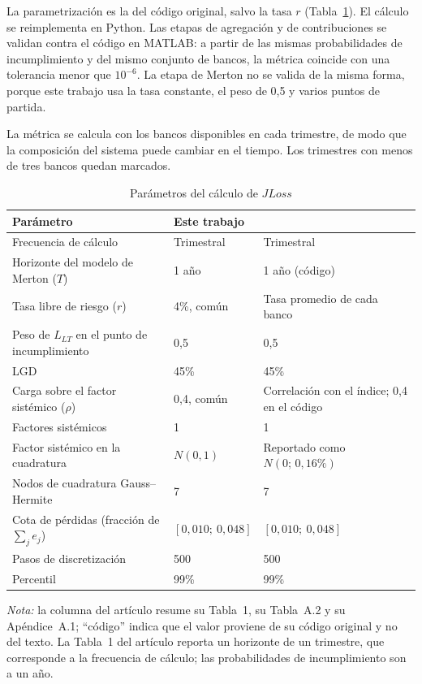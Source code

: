 La parametrización es la del código original, salvo la tasa $r$ (Tabla~\ref{tab:params}). El cálculo se reimplementa en Python. Las etapas de agregación y de contribuciones se validan contra el código en MATLAB: a partir de las mismas probabilidades de incumplimiento y del mismo conjunto de bancos, la métrica coincide con una tolerancia menor que $10^{-6}$. La etapa de Merton no se valida de la misma forma, porque este trabajo usa la tasa constante, el peso de 0,5 y varios puntos de partida.

La métrica se calcula con los bancos disponibles en cada trimestre, de modo que la composición del sistema puede cambiar en el tiempo. Los trimestres con menos de tres bancos quedan marcados.

\begin{table}[htbp]
\centering
\small
\caption{Parámetros del cálculo de $JLoss$}
\label{tab:params}
\begin{tabular}{lll}
\toprule
Parámetro & Este trabajo & \citet{Chari2024b} \\
\midrule
Frecuencia de cálculo & Trimestral & Trimestral \\
Horizonte del modelo de Merton ($T$) & 1 año & 1 año (código) \\
Tasa libre de riesgo ($r$) & 4\%, común & Tasa promedio de cada banco \\
Peso de $L_{LT}$ en el punto de incumplimiento & 0,5 & 0,5 \\
LGD & 45\% & 45\% \\
Carga sobre el factor sistémico ($\rho$) & 0,4, común & Correlación con el índice; 0,4 en el código \\
Factores sistémicos & 1 & 1 \\
Factor sistémico en la cuadratura & $N(0,1)$ & Reportado como $N(0;\,0{,}16\%)$ \\
Nodos de cuadratura Gauss--Hermite & 7 & 7 \\
Cota de pérdidas (fracción de $\sum_j e_j$) & $[0{,}010;\ 0{,}048]$ & $[0{,}010;\ 0{,}048]$ \\
Pasos de discretización & 500 & 500 \\
Percentil & 99\% & 99\% \\
\bottomrule
\end{tabular}
\par\smallskip
\begin{minipage}{0.92\linewidth}\footnotesize
\textit{Nota:} la columna del artículo resume su Tabla~1, su Tabla~A.2 y su Apéndice~A.1; ``código'' indica que el valor proviene de su código original y no del texto. La Tabla~1 del artículo reporta un horizonte de un trimestre, que corresponde a la frecuencia de cálculo; las probabilidades de incumplimiento son a un año.
\end{minipage}
\end{table}

